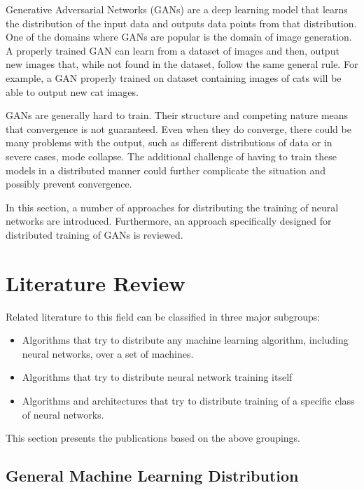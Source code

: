 \documentclass[11pt]{article}       %
\begin{document}
Generative Adversarial Networks (GANs)\cite{goodfellow2014generative} are a deep learning model that learns the distribution of the input data and outputs data points from that distribution. One of the domains where GANs are popular is the domain of image generation. A properly trained GAN can learn from a dataset of images and then, output new images that, while not found in the dataset, follow the same general rule. For example, a GAN properly trained on dataset containing images of cats will be able to output new cat images.

GANs are generally hard to train.\cite{mescheder2018training} Their structure and competing nature means that convergence is not guaranteed. Even when they do converge, there could be many problems with the output, such as different distributions of data or in severe cases, mode collapse. The additional challenge of having to train these models in a distributed manner could further complicate the situation and possibly prevent convergence.

In this section, a number of approaches for distributing the training of neural networks are introduced. Furthermore, an approach specifically designed for distributed training of GANs is reviewed.

\section{Literature Review} \label{litrev}

Related literature to this field can be classified in three major subgroups:
\begin{itemize}
\item Algorithms that try to distribute any machine learning algorithm, including neural networks, over a set of machines.
\item Algorithms that try to distribute neural network training itself
\item Algorithms and architectures that try to distribute training of a specific class of neural networks.
\end{itemize}

This section presents the publications based on the above groupings.

\subsection{General Machine Learning Distribution}
\end{document}
